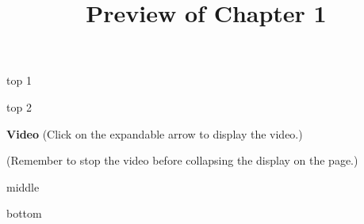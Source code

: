 \documentclass{ximera}
\title{Preview of Chapter 1}
\begin{document}
\begin{abstract}
\end{abstract}

\maketitle



top 1


top 2

\begin{explanation}
\textbf{Video} (Click on the expandable arrow to display the video.)

\begin{expandable}

\begin{center}
\end{center}

(Remember to stop the video before collapsing the display on the page.)


\end{expandable}

\end{explanation}

middle





bottom
\end{document}
